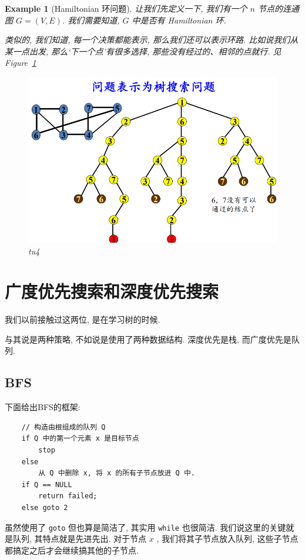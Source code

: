 \documentclass[a4paper, 10pt]{ctexart} %
\newtheorem{example}{Example}
\begin{document}
\begin{example}[Hamiltonian 环问题]
让我们先定义一下, 我们有一个 $n$ 节点的连通图 $G = \left( V ,E\right)$. 我们需要知道, $G$ 中是否有
Hamiltonian 环. 

类似的, 我们知道, 每一个决策都能表示, 那么我们还可以表示环路. 
比如说我们从某一点出发, 那么`下一个点'有很多选择, 
那些没有经过的、相邻的点就行.
见Figure~\ref{tu4}
\begin{figure}
    \centering
    \includegraphics[scale = 0.5]{ss7.png}
    \caption{tu4}
    \label{tu4}
\end{figure}
\end{example}
\section{广度优先搜索和深度优先搜索}
我们以前接触过这两位, 是在学习树的时候.

与其说是两种策略, 不如说是使用了两种数据结构. 
深度优先是栈, 而广度优先是队列.

\subsection{BFS}
下面给出BFS的框架:

\begin{verbatim}
    // 构造由根组成的队列 Q
    if Q 中的第一个元素 x 是目标节点
        stop
    else 
        从 Q 中删除 x, 将 x 的所有子节点放进 Q 中.
    if Q == NULL 
        return failed;
    else goto 2
\end{verbatim}
虽然使用了 \verb|goto| 但也算是简洁了, 其实用 \verb|while| 也很简洁. 
我们说这里的关键就是队列, 其特点就是先进先出. 
对于节点 $x$ , 我们将其子节点放入队列, 这些子节点都搞定之后才会继续搞其他的子节点.
\end{document}

